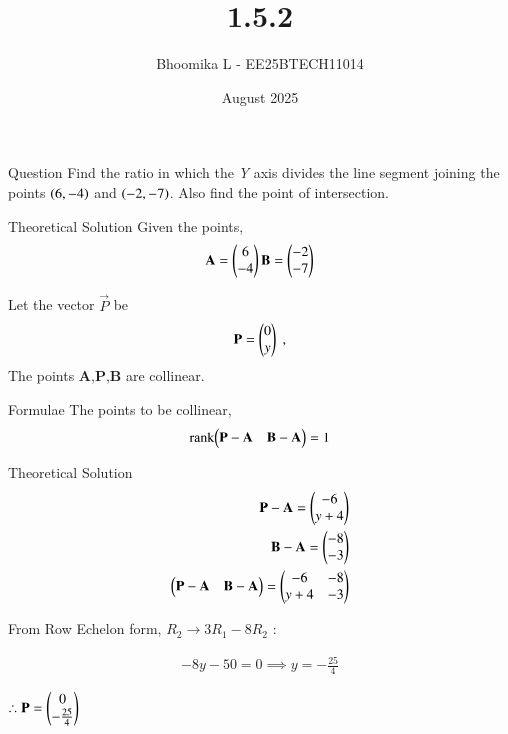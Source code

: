 \documentclass{beamer}
\title %
{1.5.2}
\date{August  2025}
\author %
{Bhoomika L - EE25BTECH11014}
\begin{document}
\frame{\titlepage}
\begin{frame}{Question}
 Find the ratio in which the \textit{Y} axis divides the line segment joining the points $\left(6,-4\right)$ and $\left(-2,-7\right)$. Also find the point of intersection.
 \end{frame}

\begin{frame}{Theoretical Solution}
Given the points,
\begin{align}
    \vec{A}=\begin{myvec}{6\\-4}\end{myvec}
    \vec{B}=\begin{myvec}{-2\\-7}\end{myvec}
\end{align}

Let the vector $\vec{P}$ be 
\begin{align}
    \vec{P}=\begin{myvec}{0\\y}\end{myvec} \;, 
\end{align}
The points \textbf{A},\textbf{P},\textbf{B} are collinear.
\end{frame}

\begin{frame}{Formulae}
The points to be collinear,
\begin{align}
	\label{eq:line-rank-2}
	\text{rank}{\ensuremath{\begin{pmatrix}\mathbf{P}-\mathbf{A}& \mathbf{B}-\mathbf{A}\end{pmatrix}}} = 1\\
\end{align}
\end{frame}

\begin{frame}{Theoretical Solution}
\begin{align}
  \mathbf{P}-\mathbf{A} = \begin{pmatrix}-6\\y+4\end{pmatrix}\\
         \mathbf{B}-\mathbf{A} = \begin{pmatrix}-8\\-3\end{pmatrix}\\
        \begin{pmatrix}\mathbf{P}-\mathbf{A}& \mathbf{B}-\mathbf{A}\end{pmatrix} = \begin{pmatrix}-6 & -8\\ y+4&-3 \end{pmatrix}
 \end{align}
 
\begin{center}
 From Row Echelon form,
$R_2 \rightarrow 3R_1-8R_2$ :
\\
\end{center}
 \begin{align}
  -8y-50=0\implies y=-\frac{25}{4}
 \end{align}
  \begin{center}
      $\therefore \vec{P}=\begin{myvec}{0\\-\frac{25}{4}}\end{myvec}$
 \end{center}
 \end{frame}
\end{document}
